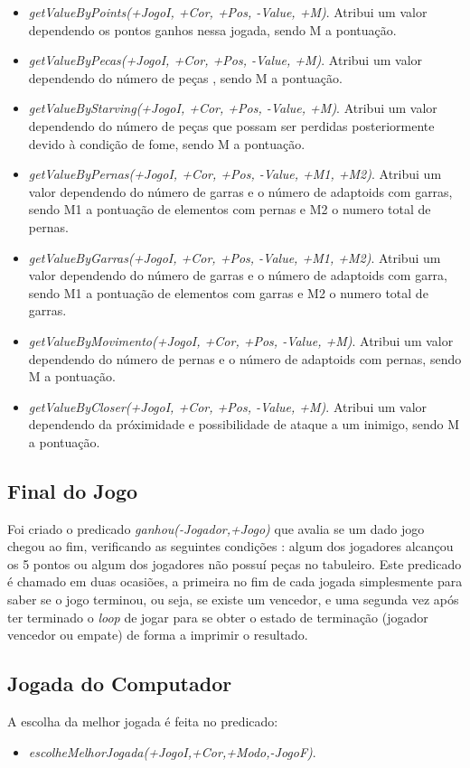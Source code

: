 \documentclass[a4paper]{article}
\begin{document}
\begin{itemize}
    \item \textit{getValueByPoints(+JogoI, +Cor, +Pos, -Value, +M)}. Atribui um valor dependendo os pontos ganhos nessa jogada, sendo M a pontuação.
    \item \textit{getValueByPecas(+JogoI, +Cor, +Pos, -Value, +M)}. Atribui um valor dependendo do número de peças , sendo M a pontuação.
    \item \textit{getValueByStarving(+JogoI, +Cor, +Pos, -Value, +M)}. Atribui um valor dependendo do número de peças que possam ser perdidas posteriormente devido à condição de fome, sendo M a pontuação.
    \item \textit{getValueByPernas(+JogoI, +Cor, +Pos, -Value, +M1, +M2)}. Atribui um valor dependendo do número de garras e o número de adaptoids com garras, sendo M1 a pontuação de elementos com pernas e M2 o numero total de pernas.
    \item \textit{getValueByGarras(+JogoI, +Cor, +Pos, -Value, +M1, +M2)}. Atribui um valor dependendo do número de garras e o número de adaptoids com garra, sendo M1 a pontuação de elementos com garras e M2 o numero total de garras.
    \item \textit{getValueByMovimento(+JogoI, +Cor, +Pos, -Value, +M)}. Atribui um valor dependendo do número de pernas e o número de adaptoids com pernas, sendo M a pontuação.
    \item \textit{getValueByCloser(+JogoI, +Cor, +Pos, -Value, +M)}. Atribui um valor dependendo da próximidade e possibilidade de ataque a um inimigo, sendo M a pontuação.
\end{itemize}

\subsection{Final do Jogo} Foi criado o predicado \textit{ganhou(-Jogador,+Jogo)} que avalia se um dado jogo chegou ao fim, verificando as seguintes condições : algum dos jogadores alcançou os 5 pontos ou algum dos jogadores não possuí peças no tabuleiro. Este predicado é chamado em duas ocasiões, a primeira no fim de cada jogada simplesmente para saber se o jogo terminou, ou seja, se existe um vencedor, e uma segunda vez após ter terminado o \textit{loop} de jogar para se obter o estado de terminação (jogador vencedor ou empate) de forma a imprimir o resultado.

\subsection{Jogada do Computador}
A escolha da melhor jogada é feita no predicado:
\begin{itemize}
	\item \textit{escolheMelhorJogada(+JogoI,+Cor,+Modo,-JogoF)}.
\end{itemize}
\end{document}
